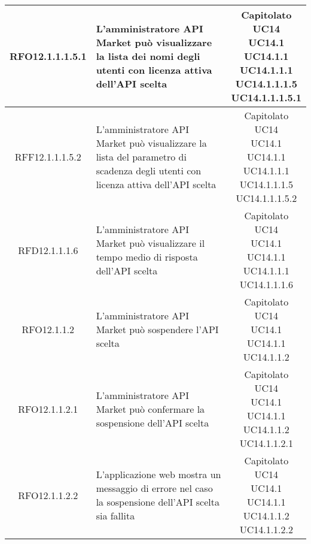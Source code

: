\begin{longtable}{|c|p{8cm}|c|}
\hypertarget{RFO12.1.1.1.5.1}{RFO12.1.1.1.5.1} & L'amministratore API Market può visualizzare la lista dei nomi degli utenti con licenza attiva dell'API scelta & \makecell*{Capitolato\\UC14\\UC14.1\\UC14.1.1\\UC14.1.1.1\\UC14.1.1.1.5\\UC14.1.1.1.5.1} \\
\hline
\hypertarget{RFF12.1.1.1.5.2}{RFF12.1.1.1.5.2} & L'amministratore API Market può visualizzare la lista del parametro di scadenza degli utenti con licenza attiva dell'API scelta & \makecell*{Capitolato\\UC14\\UC14.1\\UC14.1.1\\UC14.1.1.1\\UC14.1.1.1.5\\UC14.1.1.1.5.2} \\
\hline

\hypertarget{RFD12.1.1.1.6}{RFD12.1.1.1.6} & L'amministratore API Market può visualizzare il tempo medio di risposta dell'API scelta & \makecell*{Capitolato\\UC14\\UC14.1\\UC14.1.1\\UC14.1.1.1\\UC14.1.1.1.6} \\
\hline

\hypertarget{RFO12.1.1.2}{RFO12.1.1.2} & L'amministratore API Market può sospendere l'API scelta & \makecell*{Capitolato\\UC14\\UC14.1\\UC14.1.1\\UC14.1.1.2} \\
\hline

\hypertarget{RFO12.1.1.2.1}{RFO12.1.1.2.1} & L'amministratore API Market può confermare la sospensione dell'API scelta & \makecell*{Capitolato\\UC14\\UC14.1\\UC14.1.1\\UC14.1.1.2\\UC14.1.1.2.1} \\
\hline
\hypertarget{RFO12.1.1.2.2}{RFO12.1.1.2.2} & L'applicazione web mostra un messaggio di errore nel caso la sospensione dell'API scelta sia fallita & \makecell*{Capitolato\\UC14\\UC14.1\\UC14.1.1\\UC14.1.1.2\\UC14.1.1.2.2} \\
\hline


\end{longtable}
